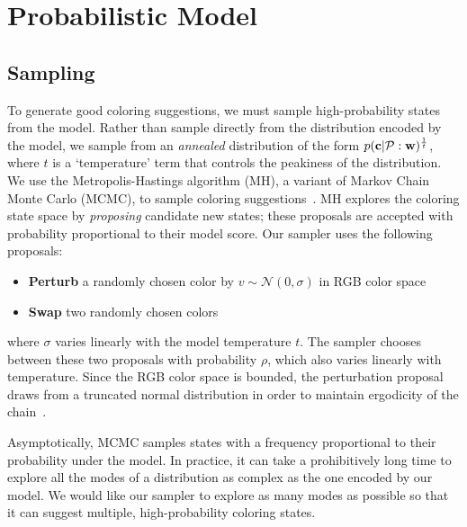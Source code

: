 \section{Probabilistic Model}
\label{sec:model}






\subsection{Sampling}
\label{sec:sampling}

To generate good coloring suggestions, we must sample high-probability states from the model. Rather than sample directly from the distribution encoded by the model, we sample from an \emph{annealed} distribution of the form $p(\mathbf{c} | \mathcal{P} : \mathbf{w})^\frac{1}{t}$, where $t$ is a `temperature' term that controls the peakiness of the distribution.
We use the Metropolis-Hastings algorithm (MH), a variant of Markov Chain Monte Carlo (MCMC), to sample coloring suggestions~\cite{Metropolis,Hastings}. MH explores the coloring state space by \emph{proposing} candidate new states; these proposals are accepted with probability proportional to their model score. Our sampler uses the following proposals:
\begin{itemize}
	\item{\textbf{Perturb} a randomly chosen color by $v \sim \mathcal{N}(0, \sigma)$ in RGB color space}
	\item{\textbf{Swap} two randomly chosen colors}
\end{itemize}
where $\sigma$ varies linearly with the model temperature $t$. The sampler chooses between these two proposals with probability $\rho$, which also varies linearly with temperature. Since the RGB color space is bounded, the perturbation proposal draws from a truncated normal distribution in order to maintain ergodicity of the chain~\cite{TruncatedGaussians}.

Asymptotically, MCMC samples states with a frequency proportional to their probability under the model. In practice, it can take a prohibitively long time to explore all the modes of a distribution as complex as the one encoded by our model. We would like our sampler to explore as many modes as possible so that it can suggest multiple, high-probability coloring states.

